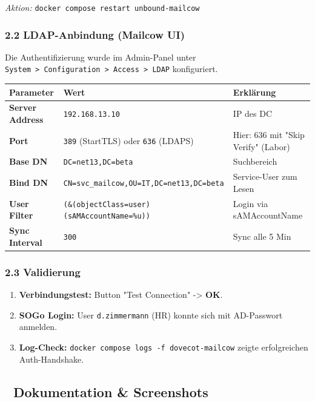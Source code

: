 \documentclass[
]{article}
\newcounter{none} %
\providecommand{\tightlist}{%
  \setlength{\itemsep}{0pt}\setlength{\parskip}{0pt}}
\begin{document}
\emph{Aktion:} \texttt{docker\ compose\ restart\ unbound-mailcow}

\subsubsection{2.2 LDAP-Anbindung (Mailcow
UI)}\label{ldap-anbindung-mailcow-ui}

Die Authentifizierung wurde im Admin-Panel unter
\texttt{System\ \textgreater{}\ Configuration\ \textgreater{}\ Access\ \textgreater{}\ LDAP}
konfiguriert.

{\def\LTcaptype{none} %
\begin{longtable}[]{@{}lll@{}}
\toprule\noalign{}
Parameter & Wert & Erklärung \\
\midrule\noalign{}
\endhead
\bottomrule\noalign{}
\endlastfoot
\textbf{Server Address} & \texttt{192.168.13.10} & IP des DC \\
\textbf{Port} & \texttt{389} (StartTLS) oder \texttt{636} (LDAPS) &
Hier: 636 mit "Skip Verify" (Labor) \\
\textbf{Base DN} & \texttt{DC=net13,DC=beta} & Suchbereich \\
\textbf{Bind DN} & \texttt{CN=svc\_mailcow,OU=IT,DC=net13,DC=beta} &
Service-User zum Lesen \\
\textbf{User Filter} &
\texttt{(\&(objectClass=user)(sAMAccountName=\%u))} & Login via
sAMAccountName \\
\textbf{Sync Interval} & \texttt{300} & Sync alle 5 Min \\
\end{longtable}
}

\subsubsection{2.3 Validierung}\label{validierung}

\begin{enumerate}
\tightlist
\item
  \textbf{Verbindungstest:} Button "Test Connection" -\textgreater{}
  \textbf{OK}.
\item
  \textbf{SOGo Login:} User \texttt{d.zimmermann} (HR) konnte sich mit
  AD-Passwort anmelden.
\item
  \textbf{Log-Check:}
  \texttt{docker\ compose\ logs\ -f\ dovecot-mailcow} zeigte
  erfolgreichen Auth-Handshake.
\end{enumerate}

\subsection{📸 Dokumentation \&
Screenshots}\label{dokumentation-screenshots}
\end{document}
